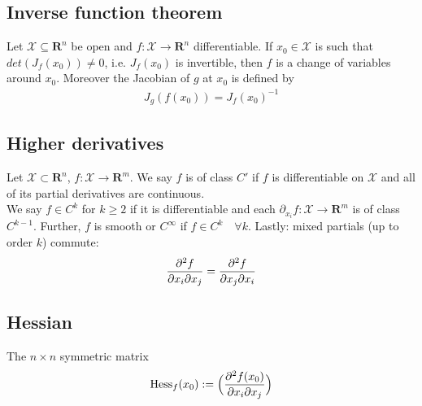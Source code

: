 \documentclass[8pt]{extarticle}
\newcommand{\R}{{\mathbb R}}
\newcommand{\X}{{\mathcal X}}
\newcommand{\ra}{{\rightarrow}}
\def\R{\mathbf{R}}
\begin{document}
\begin{multicols*}{3}
  \subsection{Inverse function theorem}
  Let $\X \subseteq \R^n$ be open and
  $f: \X \ra \R^n$ differentiable. If $x_0 \in \X$
  is such that $det(J_f(x_0)) \neq 0$, i.e. $J_f(x_0)$ is invertible, then
  $f$ is a change of variables around $x_0$. Moreover the Jacobian of $g$
  at $x_0$ is defined by
  \begin{align*}
    J_g(f(x_0)) = J_f(x_0)^{-1}
  \end{align*}
  \subsection{Higher derivatives}
  Let $\X \subset \R^n$, $f: \X \ra \R^m$. We say $f$
  is of class $C'$ if $f$ is differentiable on $\X$ and all
  of its partial derivatives are continuous.\\
  We say $f \in C^k$ for $k \geq 2$ if it is
  differentiable and each $\partial_{x_i} f : \X \ra \R^m$
  is of class $C^{k-1}$. Further, $f$ is smooth or $C^\infty$ if
  $f \in C^k \quad \forall k$. Lastly: mixed partials (up to order $k$)
  commute:
  \begin{align*}
    \pdv{^2 f}{x_i \partial x_j} = \pdv{^2 f}{ x_j \partial x_i}
  \end{align*}
  \subsection{Hessian}
  The $n \times n$ symmetric matrix
  \begin{align*}
    \text{Hess}_f(x_0) := \Big( \pdv{^2 f(x_0)}{x_i \partial x_j} \Big)
  \end{align*}

\end{multicols*}
\end{document}

